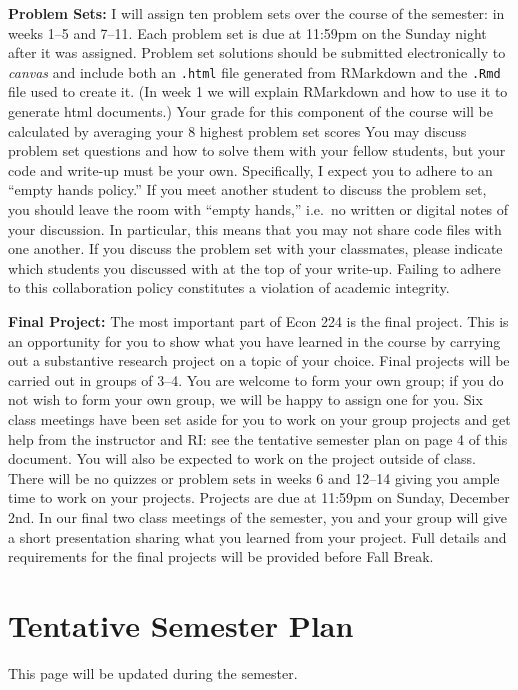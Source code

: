 \documentclass[11pt, letterpaper]{article}
\begin{document}
\medskip


\noindent \textbf{Problem Sets:} 
I will assign ten problem sets over the course of the semester: in weeks 1--5 and 7--11.
Each problem set is due at 11:59pm on the Sunday night after it was assigned.
Problem set solutions should be submitted electronically to \emph{canvas} and include both an \texttt{.html} file generated from RMarkdown and the \texttt{.Rmd} file used to create it.
(In week 1 we will explain RMarkdown and how to use it to generate html documents.)
Your grade for this component of the course will be calculated by averaging your 8 highest problem set scores
You may discuss problem set questions and how to solve them with your fellow students, but your code and write-up must be your own. 
Specifically, I expect you to adhere to an ``empty hands policy.'' 
If you meet another student to discuss the problem set, you should leave the room with ``empty hands,'' i.e.\ no written or digital notes of your discussion.
In particular, this means that you may not share code files with one another.
If you discuss the problem set with your classmates, please indicate which students you discussed with at the top of your write-up.
Failing to adhere to this collaboration policy constitutes a violation of academic integrity.

\medskip

\noindent \textbf{Final Project:}
The most important part of Econ 224 is the final project.
This is an opportunity for you to show what you have learned in the course by carrying out a substantive research project on a topic of your choice.
Final projects will be carried out in groups of 3--4.
You are welcome to form your own group; if you do not wish to form your own group, we will be happy to assign one for you.
Six class meetings have been set aside for you to work on your group projects and get help from the instructor and RI: see the tentative semester plan on page 4 of this document.
You will also be expected to work on the project outside of class.
There will be no quizzes or problem sets in weeks 6 and 12--14 giving you ample time to work on your projects.
Projects are due at 11:59pm on Sunday, December 2nd.
In our final two class meetings of the semester, you and your group will give a short presentation sharing what you learned from your project.
Full details and requirements for the final projects will be provided before Fall Break.

\newpage

\section*{Tentative Semester Plan} 
This page will be updated during the semester. 
\end{document}
